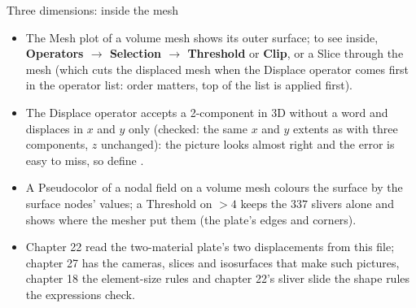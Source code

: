 \documentclass[aspectratio=169,11pt]{beamer}
\newcommand{\gui}[1]{\textsf{\textbf{#1}}}
\begin{document}
\begin{frame}{Three dimensions: inside the mesh}
\label{fr:threed2}
\footnotesize
\begin{itemize}
  \item The Mesh plot of a volume mesh shows its outer surface; to see inside, \gui{Operators $\to$ Selection $\to$ Threshold} or \gui{Clip}, or a Slice through the mesh (which cuts the displaced mesh when the Displace operator comes first in the operator list: order matters, top of the list is applied first).
  \item The Displace operator accepts a 2-component  in 3D without a word and displaces in $x$ and $y$ only (checked: the same $x$ and $y$ extents as with three components, $z$ unchanged): the picture looks almost right and the error is easy to miss, so define .
  \item A Pseudocolor of a nodal field on a volume mesh colours the surface by the surface nodes' values; a Threshold on  $> 4$ keeps the $337$ slivers alone and shows where the mesher put them (the plate's edges and corners).
  \item Chapter 22 read the two-material plate's two displacements from this file; chapter 27 has the cameras, slices and isosurfaces that make such pictures, chapter 18 the element-size rules and chapter 22's sliver slide the shape rules the  expressions check.
\end{itemize}
\end{frame}
\end{document}
